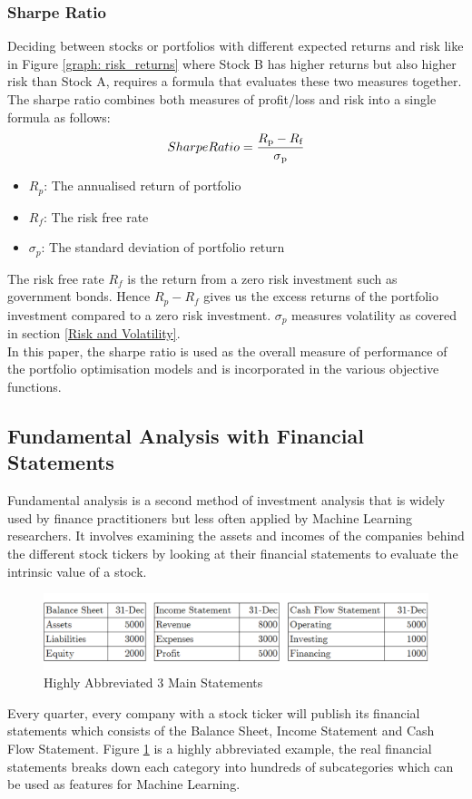 \documentclass[a4paper,12pt]{report}
\numberwithin{equation}{section}
\theoremstyle{definition}
\begin{document}
\subsubsection{Sharpe Ratio}
Deciding between stocks or portfolios with different expected returns and risk like in Figure \ref{graph: risk_returns} where Stock B has higher returns but also higher risk than Stock A, requires a formula that evaluates these two measures together. The sharpe ratio combines both measures of profit/loss and risk into a single formula as follows:
\begin{equation*}
  Sharpe Ratio = \frac{R\textsubscript{p}-R\textsubscript{f}}{\sigma\textsubscript{p}}
\end{equation*}
\begin{itemize}
  \item {$R_p$: The annualised return of portfolio}
  \item {$R_f$: The risk free rate}
  \item {$\sigma_p$: The standard deviation of portfolio return}
\end{itemize}
The risk free rate $R_f$ is the return from a zero risk investment such as government bonds. Hence $R_p - R_f$ gives us the excess returns of the portfolio investment compared to a zero risk investment. $\sigma_p$ measures volatility as covered in section \ref{Risk and Volatility}. 
\\

In this paper, the sharpe ratio is used as the overall measure of performance of the portfolio optimisation models and is incorporated in the various objective functions. 
\subsection{Fundamental Analysis with Financial Statements}
Fundamental analysis is a second method of investment analysis that is widely used by finance practitioners but less often applied by Machine Learning researchers. It involves examining the assets and incomes of the companies behind the different stock tickers by looking at their financial statements to evaluate the intrinsic value of a stock. 
\begin{figure}[H]
  \centerline{\includegraphics[width=17cm]{financial_statements}}
  \caption{Highly Abbreviated 3 Main Statements}
  \label{fig:financial statements}
\end{figure}
Every quarter, every company with a stock ticker will publish its financial statements which consists of the Balance Sheet, Income Statement and Cash Flow Statement. Figure \ref{fig:financial statements} is a highly abbreviated example, the real financial statements breaks down each category into hundreds of subcategories which can be used as features for Machine Learning.\\
\end{document}
